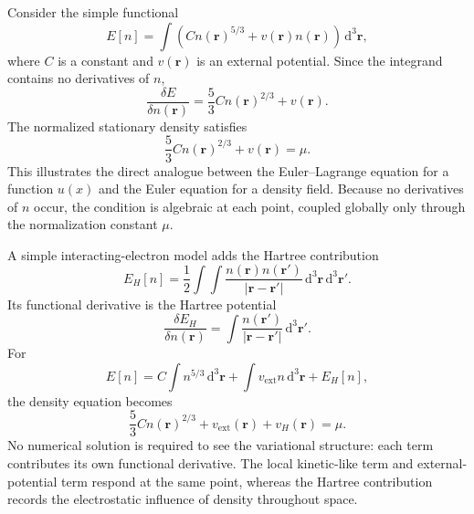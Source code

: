 \begin{example}
Consider the simple functional
\begin{equation}
E[n]=\int\left(Cn(\mathbf{r})^{5/3}
+v(\mathbf{r})n(\mathbf{r})\right)\,\mathrm{d}^3\mathbf{r},
\end{equation}
where $C$ is a constant and $v(\mathbf{r})$ is an external potential. Since the integrand contains no derivatives of $n$,
\begin{equation}
\frac{\delta E}{\delta n(\mathbf{r})}
=\frac{5}{3}C n(\mathbf{r})^{2/3}+v(\mathbf{r}).
\end{equation}
The normalized stationary density satisfies
\begin{equation}
\frac{5}{3}C n(\mathbf{r})^{2/3}+v(\mathbf{r})=\mu.
\end{equation}
This illustrates the direct analogue between the Euler--Lagrange equation for a function $u(x)$ and the Euler equation for a density field. Because no derivatives of $n$ occur, the condition is algebraic at each point, coupled globally only through the normalization constant $\mu$.
\end{example}

\begin{example}
A simple interacting-electron model adds the Hartree contribution
\begin{equation}
E_H[n]=\frac12\int\!\int
\frac{n(\mathbf{r})n(\mathbf{r}')}{|\mathbf{r}-\mathbf{r}'|}
\,\mathrm{d}^3\mathbf{r}\,\mathrm{d}^3\mathbf{r}'.
\end{equation}
Its functional derivative is the Hartree potential
\begin{equation}
\frac{\delta E_H}{\delta n(\mathbf{r})}
=\int\frac{n(\mathbf{r}')}{|\mathbf{r}-\mathbf{r}'|}\,\mathrm{d}^3\mathbf{r}'.
\end{equation}
For
\begin{equation}
E[n]=C\int n^{5/3}\,\mathrm{d}^3\mathbf{r}
+\int v_{\mathrm{ext}}n\,\mathrm{d}^3\mathbf{r}+E_H[n],
\end{equation}
the density equation becomes
\begin{equation}
\frac53 Cn(\mathbf{r})^{2/3}+v_{\mathrm{ext}}(\mathbf{r})
+v_H(\mathbf{r})=\mu.
\end{equation}
No numerical solution is required to see the variational structure: each term contributes its own functional derivative. The local kinetic-like term and external-potential term respond at the same point, whereas the Hartree contribution records the electrostatic influence of density throughout space.
\end{example}
